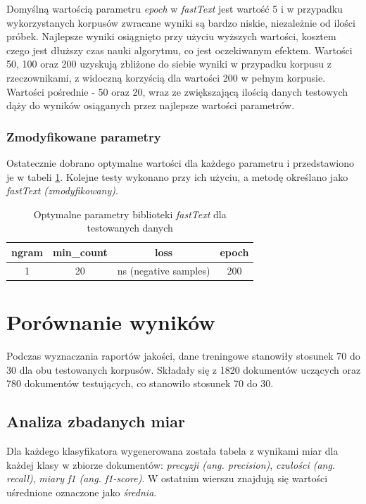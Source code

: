 Domyślną wartością parametru \textit{epoch} w \textit{fastText} jest wartość 5 i w przypadku wykorzystanych korpusów zwracane wyniki są bardzo niskie, niezależnie od ilości próbek. Najlepsze wyniki osiągnięto przy użyciu wyższych wartości, kosztem czego jest dłuższy czas nauki algorytmu, co jest oczekiwanym efektem. Wartości 50, 100 oraz 200 uzyskują zbliżone do siebie wyniki w przypadku korpusu z rzeczownikami, z widoczną korzyścią dla wartości 200 w pełnym korpusie. Wartości pośrednie - 50 oraz 20, wraz ze zwiększającą ilością danych testowych dąży do wyników osiąganych przez najlepsze wartości parametrów.

\subsubsection{Zmodyfikowane parametry}
Ostatecznie dobrano optymalne wartości dla każdego parametru i  przedstawiono je w tabeli \ref{tab:optimal-param}. Kolejne testy wykonano przy ich użyciu, a metodę określano jako \textit{fastText (zmodyfikowany)}.

\begin{table}[hb!]
\centering
\caption{Optymalne parametry biblioteki \textit{fastText} dla testowanych danych}
\label{tab:optimal-param}
\begin{tabular}{|c|c|c|c|}
\hline
ngram & min\_count & loss                  & epoch \\ \hline
1     & 20         & ns (negative samples) & 200   \\ \hline
\end{tabular}
\end{table}

\clearpage
\section{Porównanie wyników}

Podczas wyznaczania raportów jakości, dane treningowe stanowiły stosunek 70 do 30 dla obu testowanych korpusów. Składały się z 1820 dokumentów uczących oraz 780 dokumentów testujących, co stanowiło stosunek 70 do 30.

\subsection{Analiza zbadanych miar}
Dla każdego klasyfikatora wygenerowana została tabela z wynikami miar dla każdej klasy w zbiorze dokumentów: \textit{precyzji (ang. precision)}, \textit{czułości (ang. recall)}, \textit{miary f1 (ang. f1-score)}. W ostatnim wierszu znajdują się wartości uśrednione oznaczone jako \textit{średnia}.


